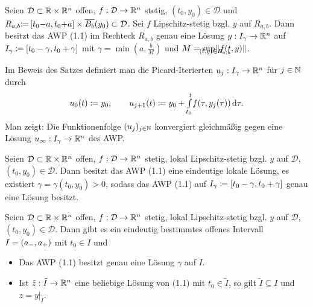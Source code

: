 \documentclass{cheat-sheet}
\newcommand{\D}{\mathcal{D}}
\begin{document}

\begin{satz}
  Seien $\D \subset \R \times \R^n$ offen, $f : \D \to \R^n$ stetig, $(t_0, y_0) {\in} \D$ und $R_{a,b} {\coloneqq} \cinterval{ t_0 {-} a }{ t_0 {+} a } \times \overline{B_b}(y_0) \subset \D$. Sei $f$ Lipschitz-stetig bzgl. $y$ auf $R_{a,b}$. Dann besitzt das AWP (1.1) im Rechteck $R_{a,b}$ genau eine Lösung $y : I_{\gamma} \to \mathbb{R}^n$ auf $I_{\gamma} \coloneqq \left[ t_0 - \gamma, t_0 + \gamma \right]$ mit $\gamma = \min(a, \tfrac{b}{M})$ und $M = \sup_{\mathclap{(t,y) \in R_{a,b}}} \norm{f(t, y)}$.
\end{satz}

\begin{bem}
  Im Beweis des Satzes definiert man die Picard-Iterierten $u_j : I_\gamma \to \mathbb{R}^n$ für $j \in \mathbb{N}$ durch
  \[
    u_0(t) \coloneqq y_0, \qquad
    u_{j+1}(t) \coloneqq y_0 + {\textstyle \int\limits_{t_0}^{t}} f(\tau, y_j(\tau)) \,\mathrm{d} \tau.
  \]
  Man zeigt: Die Funktionenfolge $(u_j)_{j \in \mathbb{N}}$ konvergiert gleichmäßig gegen eine Lösung $u_\infty : I_\gamma \to \mathbb{R}^n$ des AWP.
\end{bem}


\begin{satz}
  Seien $\D \subset \R \times \R^n$ offen, $f : \D \to \R^n$ stetig, lokal Lipschitz-stetig bzgl. $y$ auf $\D$, $(t_0, y_0) \in \D$. Dann besitzt das AWP (1.1) eine eindeutige lokale Lösung, \dh{} es existiert $\gamma = \gamma(t_0, y_0) > 0$, sodass das AWP (1.1) auf $I_\gamma \coloneqq \left[ t_0 - \gamma, t_0 + \gamma \right]$ genau eine Lösung besitzt.
\end{satz}

\begin{satz}
  Seien $\D \subset \R \times \R^n$ offen, $f : \D \to \R^n$ stetig, lokal Lipschitz-stetig bzgl. $y$ auf $\D$, $(t_0, y_0) \in \D$. Dann gibt es ein eindeutig bestimmtes offenes Intervall $I = \left( a_-, a_+ \right)$ mit $t_0 {\in} I$ und
  \begin{itemize}
    \item Das AWP (1.1) besitzt genau eine Lösung $\gamma$ auf $I$.
    \item Ist $\tilde{z} : \tilde{I} \to \mathbb{R}^n$ eine beliebige Lösung von (1.1) mit $t_0 \in \tilde{I}$, so gilt $\tilde{I} \subseteq I$ und $z = y|_{\tilde{I}}$.
  \end{itemize}
\end{satz}
\end{document}
